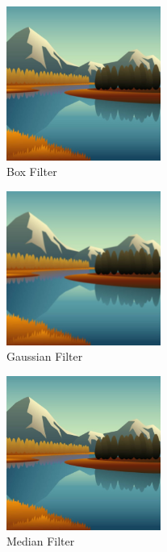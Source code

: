 \documentclass{article}
\begin{document}
\begin{figure}[H]
    \centering
    \includegraphics[width = 0.45\textwidth]{imgs/box_filtered_artwork.jpg}
    \caption{Box Filter}
    \label{fig:box_filter}
\end{figure}

\begin{figure}[H]
    \centering
    \includegraphics[width = 0.45\textwidth]{imgs/gaussian_artwork.jpg}
    \caption{Gaussian Filter}
    \label{fig:gaussian}
\end{figure}

\begin{figure}[H]
    \centering
    \includegraphics[width = 0.45\textwidth]{imgs/median_artwork.jpg}
    \caption{Median Filter}
    \label{fig:median}
\end{figure}
\end{document}
